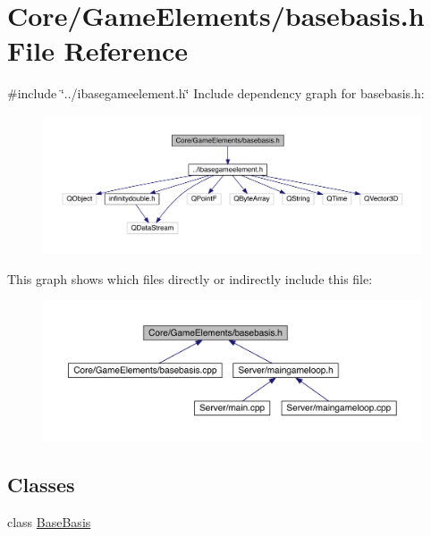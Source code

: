 \hypertarget{a00029}{}\section{Core/\+Game\+Elements/basebasis.h File Reference}
\label{a00029}
{\ttfamily \#include \char`\"{}../ibasegameelement.\+h\char`\"{}}\newline
Include dependency graph for basebasis.\+h\+:
\nopagebreak
\begin{figure}[H]
\begin{center}
\leavevmode
\includegraphics[width=350pt]{d5/d79/a00030}
\end{center}
\end{figure}
This graph shows which files directly or indirectly include this file\+:
\nopagebreak
\begin{figure}[H]
\begin{center}
\leavevmode
\includegraphics[width=350pt]{df/d61/a00031}
\end{center}
\end{figure}
\subsection*{Classes}
\begin{DoxyCompactItemize}
\item 
class \hyperlink{a00149}{Base\+Basis}
\end{DoxyCompactItemize}
